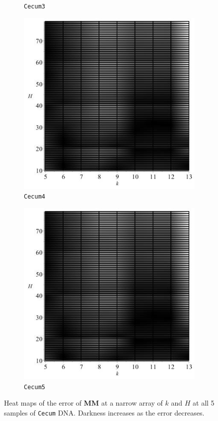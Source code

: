 \documentclass[../../main.tex]{subfiles}
\begin{document}
\begin{figure}[H]
\begin{subfigure}[b]{.5\textwidth}
\caption{\texttt{Cecum3}}
\end{subfigure}
\begin{subfigure}[b]{.5\textwidth}
\includegraphics[width=\textwidth]{precision/minmax/cecum4precise}
\caption{\texttt{Cecum4}}
\end{subfigure}
\begin{subfigure}[b]{.5\textwidth}
\includegraphics[width=\textwidth]{precision/minmax/cecum5precise}
\caption{\texttt{Cecum5}}
\end{subfigure}
\caption{Heat maps of the error of {\bf MM} at a narrow array of $k$ and $H$ at all 5 samples of \texttt{Cecum} DNA. Darkness increases as the error decreases.}\label{fig:Cpreciseminmax}
\end{figure}
\end{document}
